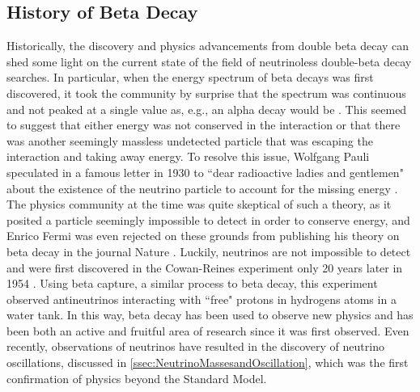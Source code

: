 \subsection{History of Beta Decay}
Historically, the discovery and physics advancements from double beta decay can shed some light on the current state of the field of neutrinoless double-beta decay searches. In particular, when the energy spectrum of beta decays was first discovered, it took the community by surprise that the spectrum was continuous and not peaked at a single value as, e.g., an alpha decay would be \cite{o.vonbayero.hahnl.meitner}. This seemed to suggest that either energy was not conserved in the interaction or that there was another seemingly massless undetected particle that was escaping the interaction and taking away energy. To resolve this issue, Wolfgang Pauli speculated in a famous letter in 1930 to ``dear radioactive ladies and gentlemen" about the existence of the neutrino particle to account for the missing energy \cite{pauli_1930}. The physics community at the time was quite skeptical of such a theory, as it posited a particle seemingly impossible to detect in order to conserve energy, and Enrico Fermi was even rejected on these grounds from publishing his theory on beta decay in the journal Nature \cite{fermi_1934}. Luckily, neutrinos are not impossible to detect and were first discovered in the Cowan-Reines experiment only 20 years later in 1954 \cite{PhysRev.92.830}. Using beta capture, a similar process to beta decay, this experiment observed antineutrinos interacting with ``free" protons in hydrogens atoms in a water tank. In this way, beta decay has been used to observe new physics and has been both an active and fruitful area of research since it was first observed. Even recently, observations of neutrinos have resulted in the discovery of neutrino oscillations, discussed in \autoref{ssec:NeutrinoMassesandOscillation}, which was the first confirmation of physics beyond the Standard Model.

